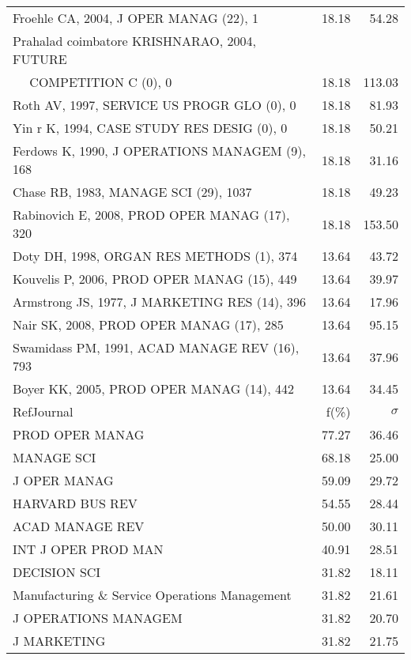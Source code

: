 \documentclass[a4paper,11pt]{report}
\begin{document}
\begin{landscape}
\begin{table}[!ht]
{\begin{tabular}{|l r r|}
Froehle CA, 2004, J OPER MANAG (22), 1 & 18.18 & 54.28\\
Prahalad coimbatore KRISHNARAO, 2004, FUTURE &  & \\
$\quad$ COMPETITION C (0), 0 & 18.18 & 113.03\\
Roth AV, 1997, SERVICE US PROGR GLO (0), 0 & 18.18 & 81.93\\
Yin r K, 1994, CASE STUDY RES DESIG (0), 0 & 18.18 & 50.21\\
Ferdows K, 1990, J OPERATIONS MANAGEM (9), 168 & 18.18 & 31.16\\
Chase RB, 1983, MANAGE SCI (29), 1037 & 18.18 & 49.23\\
Rabinovich E, 2008, PROD OPER MANAG (17), 320 & 18.18 & 153.50\\
Doty DH, 1998, ORGAN RES METHODS (1), 374 & 13.64 & 43.72\\
Kouvelis P, 2006, PROD OPER MANAG (15), 449 & 13.64 & 39.97\\
Armstrong JS, 1977, J MARKETING RES (14), 396 & 13.64 & 17.96\\
Nair SK, 2008, PROD OPER MANAG (17), 285 & 13.64 & 95.15\\
Swamidass PM, 1991, ACAD MANAGE REV (16), 793 & 13.64 & 37.96\\
Boyer KK, 2005, PROD OPER MANAG (14), 442 & 13.64 & 34.45\\
\hline
\hline
RefJournal & f(\%) & $\sigma$\\
\hline
PROD OPER MANAG & 77.27 & 36.46\\
MANAGE SCI & 68.18 & 25.00\\
J OPER MANAG & 59.09 & 29.72\\
HARVARD BUS REV & 54.55 & 28.44\\
ACAD MANAGE REV & 50.00 & 30.11\\
INT J OPER PROD MAN & 40.91 & 28.51\\
DECISION SCI & 31.82 & 18.11\\
Manufacturing \& Service Operations Management & 31.82 & 21.61\\
J OPERATIONS MANAGEM & 31.82 & 20.70\\
J MARKETING & 31.82 & 21.75\\
\hline
\end{tabular}
}
\end{table}

\end{landscape}
\end{document}
